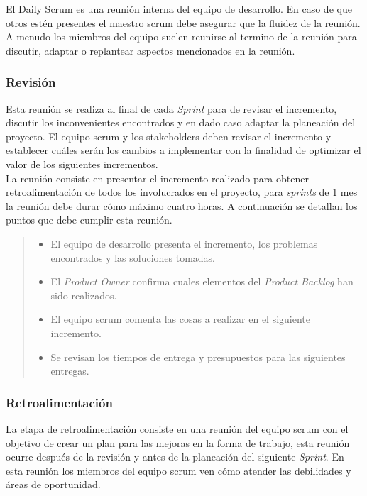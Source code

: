  \noindent El Daily Scrum es una reunión interna del equipo de desarrollo. En caso de que otros estén presentes
 el maestro scrum debe asegurar que la fluidez de la reunión. A menudo los miembros del equipo suelen reunirse
 al termino de la reunión para discutir, adaptar o replantear aspectos mencionados en la reunión.
    
\subsubsection{Revisión}

 Esta reunión se realiza al final de cada {\it Sprint} para de revisar el incremento, discutir los inconvenientes
 encontrados y en dado caso adaptar la planeación del proyecto. El equipo scrum y los stakeholders deben
 revisar el incremento y establecer cuáles serán los cambios a implementar con la finalidad de optimizar el valor
 de los siguientes incrementos.\\

 \noindent La reunión consiste en presentar el incremento realizado para obtener retroalimentación de todos
 los involucrados en el proyecto, para {\it sprints} de 1 mes la reunión debe durar cómo máximo cuatro horas.
 A continuación se detallan los puntos que debe cumplir esta reunión.

    \begin{quote}
    \begin{itemize}
    \item El equipo de desarrollo presenta el incremento, los problemas encontrados y las soluciones
            tomadas.

    \item El {\it Product Owner} confirma cuales elementos del {\it Product Backlog} han sido realizados.
    \item El equipo scrum comenta las cosas a realizar en el siguiente incremento.
    \item Se revisan los tiempos de entrega y presupuestos para las siguientes entregas.
    \end{itemize}
    \end{quote}


\subsubsection{Retroalimentación}

 La etapa de retroalimentación consiste en una reunión del equipo scrum con el objetivo de crear un plan para
 las mejoras en la forma de trabajo, esta reunión ocurre después de la revisión y antes de la planeación del
 siguiente {\it Sprint}. En esta reunión los miembros del equipo scrum ven cómo atender las debilidades y áreas
 de oportunidad.\\

